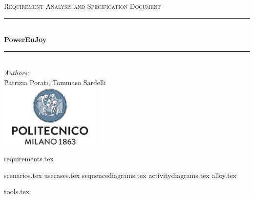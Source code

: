 \documentclass[a4paper,11pt]{article}
\begin{document}
\begin{titlepage}
\begin{center}
\textsc{\LARGE Requirement Analysis and Specification Document}\\[1.5cm] %

\rule{\linewidth}{0.5mm} \\[0.7cm]
{\huge \bfseries PowerEnJoy}\\[0.4cm] %
\rule{\linewidth}{0.5mm} \\[1.5cm]
 
\emph{Authors:}\\
Patrizia Porati, Tommaso Sardelli\\[2.0cm] 

\vfill
\vfill
\includegraphics[width=50mm]{polimi.png}\\
\end{center}
\end{titlepage}

\tableofcontents
\pagebreak



{requirements.tex}

{scenarios.tex}
{usecases.tex}
{sequencediagrams.tex}
{activitydiagrams.tex}
{alloy.tex}

{tools.tex}

\end{document}
